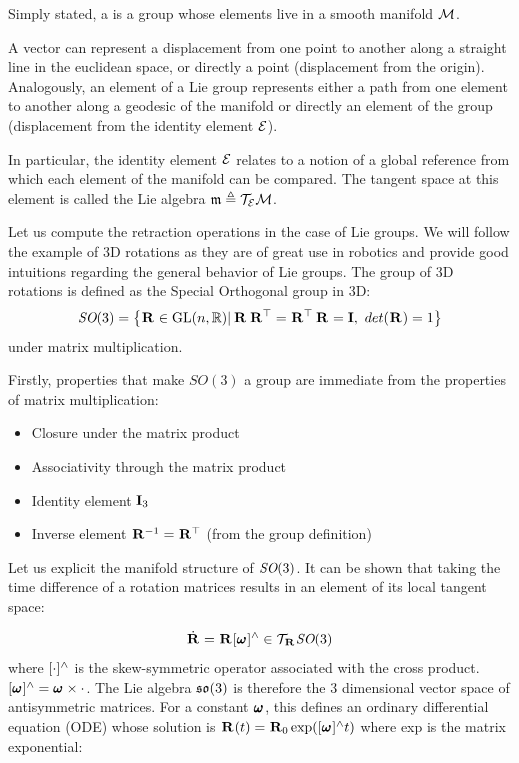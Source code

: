 Simply stated, a  is a group whose elements live in a smooth manifold $\mathcal{M}$.

A vector can represent a displacement from one point to another along a straight line in the euclidean space, or directly a point (displacement from the origin).
Analogously, an element of a Lie group represents either a path from one element to another along a geodesic of the manifold or directly an element of the group 
(displacement from the identity element $\mathcal{E}$).

In particular, the identity element $\mathcal{E}$ relates to a notion of a global reference from which each element of the manifold can be compared.
The tangent space at this element is called the Lie algebra $\mathfrak{m} \triangleq \mathcal{T}_{\mathcal{E}}\mathcal{M}$.

Let us compute the retraction operations in the case of Lie groups. We will follow the example of 3D rotations as they are of great use in robotics and provide
good intuitions regarding the general behavior of Lie groups.
The group of 3D rotations is defined as the Special Orthogonal group in 3D: 
%
\begin{equation}
    \textit{SO}(3) = \left\{\prescript{}{}{{\bf R}}_{} \in \text{GL}(n,\mathbb{R}) | \prescript{}{}{{\bf R}}_{}\prescript{}{}{{\bf R}}_{}^{\top}=\prescript{}{}{{\bf R}}_{}^{\top}\prescript{}{}{{\bf R}}_{}={\bf I},~det(\prescript{}{}{{\bf R}}_{})=1\right\}
\end{equation}
%
under matrix multiplication.


Firstly, properties that make $SO(3)$ a group are immediate from the properties of matrix multiplication:
%
\begin{itemize}
    \item Closure under the matrix product
    \item Associativity through the matrix product
    \item Identity element ${\bf I}_3$
    \item Inverse element $\prescript{}{}{{\bf R}}_{}^{-1} = \prescript{}{}{{\bf R}}_{}^{\top}$ (from the group definition)
\end{itemize}

Let us explicit the manifold structure of $\textit{SO}(3)$.
It can be shown \cite{sola2018micro} that taking the time difference of a rotation matrices results in an element of its local tangent space:

\begin{equation}
    \dot{\prescript{}{}{{\bf R}}_{}} = \prescript{}{}{{\bf R}}_{} [\prescript{}{}{\pmb{\omega}}_{}]^\wedge \in \mathcal{T}_{\prescript{}{}{{\bf R}}_{}}\textit{SO}(3)    
\end{equation}
%
where $[\cdot]^\wedge$ is the skew-symmetric operator associated with the cross product. 
\mbox{$[\prescript{}{}{\pmb{\omega}}_{}]^\wedge = \prescript{}{}{\pmb{\omega}}_{} \times \cdot$}. The Lie algebra ${\mathfrak {so}}(3)$ is therefore the 3 dimensional vector space of antisymmetric matrices.
For a constant $\prescript{}{}{\pmb{\omega}}_{}$, this defines an ordinary differential equation (ODE) whose solution
is $\prescript{}{}{{\bf R}}_{}(t)=\prescript{}{}{{\bf R}}_{0}\exp([\prescript{}{}{\pmb{\omega}}_{}]^\wedge t)$ where exp is the matrix exponential:

